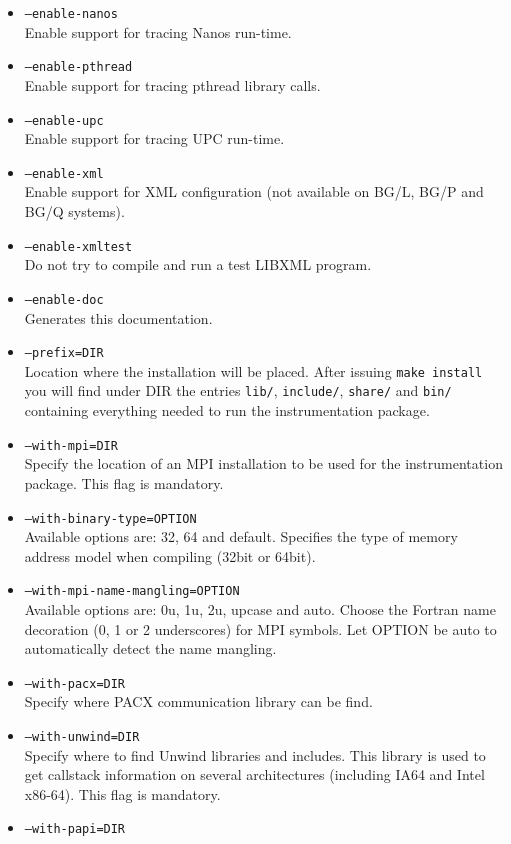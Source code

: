 \begin{itemize}
	\item {\tt --enable-nanos} \\
	Enable support for tracing Nanos run-time.
	\item {\tt --enable-pthread} \\
	Enable support for tracing pthread library calls.
	\item {\tt --enable-upc} \\
	Enable support for tracing UPC run-time.
	\item {\tt --enable-xml} \\
	Enable support for XML configuration (not available on BG/L, BG/P and BG/Q systems).
	\item {\tt --enable-xmltest} \\
	Do not try to compile and run a test LIBXML program.
	\item {\tt --enable-doc} \\
	Generates this documentation.
	\item {\tt --prefix=DIR} \\
	Location where the installation will be placed. After issuing {\tt make install} you will find under DIR the entries {\tt lib/}, {\tt include/}, {\tt share/} and {\tt bin/} containing everything needed to run the instrumentation package.
	\item {\tt --with-mpi=DIR} \\
	Specify the location of an MPI installation to be used for the instrumentation package. This flag is mandatory.
	\item {\tt --with-binary-type=OPTION} \\
	Available options are: 32, 64 and default. Specifies the type of memory address model when compiling (32bit or 64bit).
	\item {\tt --with-mpi-name-mangling=OPTION} \\
	Available options are: 0u, 1u, 2u, upcase and auto. Choose the Fortran name decoration (0, 1 or 2 underscores) for MPI symbols. Let OPTION be auto to automatically detect the name mangling.
	\item {\tt --with-pacx=DIR} \\
	Specify where PACX communication library can be find.
	\item {\tt --with-unwind=DIR} \\
	Specify where to find Unwind libraries and includes. This library is used to get callstack information on several architectures (including IA64 and Intel x86-64). This flag is mandatory.
	\item {\tt --with-papi=DIR} \\

\end{itemize}
